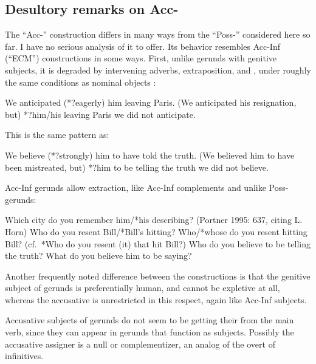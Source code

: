 \documentclass[output=paper,
modfonts
]{LSP/langsci}
\begin{document}
\subsection{Desultory remarks on Acc-}
\label{accing}
The  ``Acc-'' construction differs in many ways from the
``Poss-''  considered here so far.  I have no serious analysis of it to
offer.  Its behavior resembles Acc-Inf (``ECM'') constructions in some ways.
First, unlike gerunds with genitive subjects, it is degraded by intervening adverbs,
extraposition, and , under roughly the same conditions as nominal objects \citep{Portner1995,pires2006}:%
\begin{exe}
\ex\label{separation}
	\ea We anticipated (*?eagerly) him leaving Paris.
	\ex (We anticipated his resignation, but) *?him/his leaving Paris we did not anticipate.
	\z  
\end{exe}
This is the same pattern as:
\begin{exe}
\ex\label{separationa}
	\ea We believe (*?strongly) him to have told the truth. 
	\ex (We believed him to have been mistreated, but) *?him to be telling the truth we did not believe.
	\z    
\end{exe}


Acc-Inf gerunds allow extraction,  like Acc-Inf complements and  unlike Poss- gerunds:
\begin{exe}
\ex
	\ea Which city do you remember him/*his describing? (Portner 1995: 637, citing L. Horn)
	\ex Who do you resent Bill/*Bill's hitting?  \citep[263]{williams1975}
	\ex Who/*whose do you resent hitting Bill?  (cf.\ *Who do you resent (it) that hit Bill?)
	\ex Who do you believe to be telling the truth?
	\ex What do you believe him to be saying?
	\z    
\end{exe}
Another frequently noted difference between the constructions is that the genitive subject of
gerunds is preferentially human, and cannot be expletive  at all, whereas the
accusative is unrestricted in this respect, again like Acc-Inf subjects.
Accusative subjects of gerunds do not seem to be getting their  from the main verb, since
they can appear in gerunds that function as subjects.  Possibly the accusative  assigner is
a null  or complementizer, an analog of the overt  of 
infinitives. \largerpage
\end{document}
